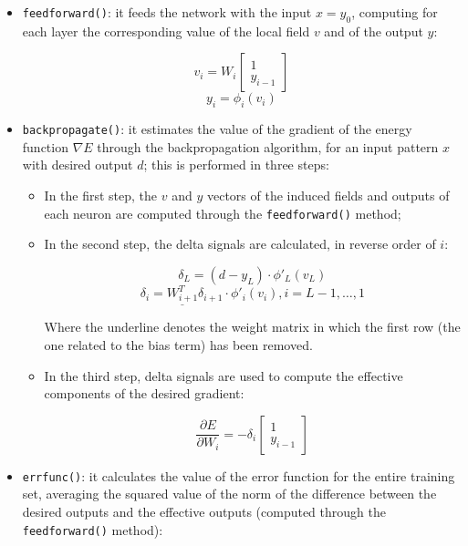 \documentclass[letterpaper,headings=standardclasses]{scrartcl}
\begin{document}
\begin{itemize}

    \item \texttt{feedforward()}: it feeds the network with the input $x = y_0$, computing for each layer the corresponding value of the local field $v$ and of the output $y$:
    
    $$ v_i = W_i \left[ \begin{matrix} 1 \\ y_{i - 1} \end{matrix} \right] $$
    $$ y_i = \phi_i(v_i) $$
    
    \item \texttt{backpropagate()}: it estimates the value of the gradient of the energy function $\nabla E$ through the backpropagation algorithm, for an input pattern $x$ with desired output $d$; this is performed in three steps:
    
    \begin{itemize}

        \item In the first step, the $v$ and $y$ vectors of the induced fields and outputs of each neuron are computed through the \texttt{feedforward()} method;

        \item In the second step, the delta signals are calculated, in reverse order of $i$:
        
        $$ \delta_L = (d - y_L) \cdot \phi'_L(v_L) $$
        $$ \delta_i = \underline{W_{i + 1}^T} \delta_{i + 1} \cdot \phi'_i(v_i), i = L - 1, \dots, 1 $$

        Where the underline denotes the weight matrix in which the first row (the one related to the bias term) has been removed.

        \item In the third step, delta signals are used to compute the effective components of the desired gradient:
        
        $$ \frac{\partial E}{\partial W_i} = -\delta_i \left[ \begin{matrix} 1 \\ y_{i - 1} \end{matrix} \right] $$

    \end{itemize}
    
    \item \texttt{errfunc()}: it calculates the value of the error function for the entire training set, averaging the squared value of the norm of the difference between the desired outputs and the effective outputs (computed through the \texttt{feedforward()} method):
    

\end{itemize}
\end{document}
